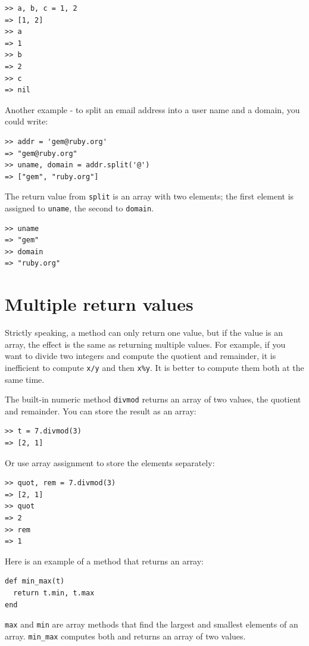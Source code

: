 \documentclass[10pt]{book}
\begin{document}
\begin{verbatim}
>> a, b, c = 1, 2
=> [1, 2]
>> a
=> 1
>> b
=> 2
>> c
=> nil
\end{verbatim}
%
Another example - to split an email address
into a user name and a domain, you could write:

\begin{verbatim}
>> addr = 'gem@ruby.org'
=> "gem@ruby.org"
>> uname, domain = addr.split('@')
=> ["gem", "ruby.org"]
\end{verbatim}
%
The return value from {\tt split} is an array with two elements;
the first element is assigned to {\tt uname}, the second to
{\tt domain}.

\begin{verbatim}
>> uname
=> "gem"
>> domain
=> "ruby.org"
\end{verbatim}
%

\section{Multiple return values}

Strictly speaking, a method can only return one value, but
if the value is an array, the effect is the same as returning
multiple values.  For example, if you want to divide two integers
and compute the quotient and remainder, it is inefficient to
compute {\tt x/y} and then {\tt x\%y}.  It is better to compute
them both at the same time.

The built-in numeric method {\tt divmod}
returns an array of two values, the quotient and remainder.
You can store the result as an array:

\begin{verbatim}
>> t = 7.divmod(3)
=> [2, 1]
\end{verbatim}
%
Or use array assignment to store the elements separately:

\begin{verbatim}
>> quot, rem = 7.divmod(3)
=> [2, 1]
>> quot
=> 2
>> rem
=> 1
\end{verbatim}
%
Here is an example of a method that returns an array:

\begin{verbatim}
def min_max(t)
  return t.min, t.max
end
\end{verbatim}
%
{\tt max} and {\tt min} are array methods that find
the largest and smallest elements of an array.  \verb"min_max"
computes both and returns an array of two values.
\end{document}
